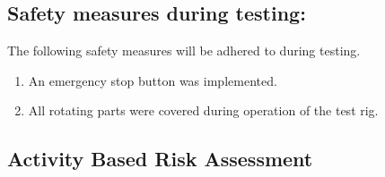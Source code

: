 \subsection*{Safety measures during testing:}

The following safety measures will be adhered to during testing.

\begin{enumerate}
	\item An emergency stop button was implemented.
	\item All rotating parts were covered during operation of the test rig.
\end{enumerate}

\subsection*{Activity Based Risk Assessment}

